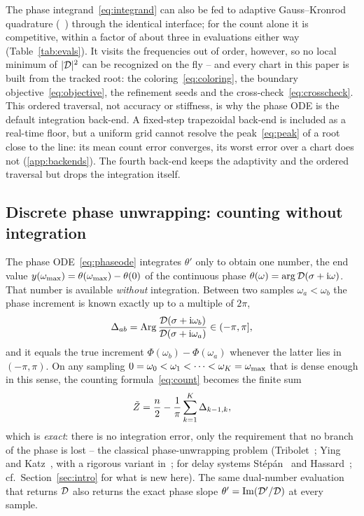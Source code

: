 The phase integrand~\eqref{eq:integrand} can also be fed to adaptive
Gauss--Kronrod quadrature (~\cite{johnson2013quadgk}) through
the identical interface; for the count alone it is competitive, within a
factor of about three in evaluations either way (Table~\ref{tab:evals}).
It visits the frequencies out of order, however, so no local minimum of
$|\mathcal{D}|^{2}$ can be recognized on the fly -- and every chart in this paper
is built from the tracked root: the coloring~\eqref{eq:coloring}, the
boundary objective~\eqref{eq:objective}, the refinement seeds and the
cross-check~\eqref{eq:crosscheck}. This ordered traversal, not accuracy or
stiffness, is why the phase ODE is the default integration back-end. A
fixed-step trapezoidal back-end is included as a real-time floor, but a
uniform grid cannot resolve the peak~\eqref{eq:peak} of a root close to the
line: its mean count error converges, its worst error over a chart does not
(\ref{app:backends}). The fourth back-end keeps the adaptivity and the
ordered traversal but drops the integration itself.
\subsection{Discrete phase unwrapping: counting without integration}\label{sec:unwrap}

The phase ODE~\eqref{eq:phaseode} integrates $\theta'$ only to obtain one
number, the end value $y(\omega_{\mathrm{max}})=\theta(\omega_{\mathrm{max}})-\theta(0)$ of the continuous
phase $\theta(\omega)=\arg\mathcal{D}(\sigma+\mathrm{i}\omega)$. That number is available
\emph{without} integration. Between two samples $\omega_a<\omega_b$ the phase
increment is known exactly up to a multiple of $2\pi$,
\begin{equation}\label{eq:dphase}
  \Delta_{ab} = \operatorname{Arg}\frac{\mathcal{D}(\sigma+\mathrm{i}\omega_b)}{\mathcal{D}(\sigma+\mathrm{i}\omega_a)}
  \in(-\pi,\pi],
\end{equation}
and it equals the true increment $\Phi(\omega_b)-\Phi(\omega_a)$ whenever
the latter lies in $(-\pi,\pi)$. On any sampling
$0=\omega_0<\omega_1<\dots<\omega_K=\omega_{\mathrm{max}}$ that is dense enough in this sense,
the counting formula~\eqref{eq:count} becomes the finite sum
\begin{equation}\label{eq:unwrapcount}
  \tilde{Z} = \frac{n}{2} - \frac{1}{\pi}\sum_{k=1}^{K}\Delta_{k-1,k},
\end{equation}
which is \emph{exact}: there is no integration error, only the requirement
that no branch of the phase is lost -- the classical phase-unwrapping problem
(Tribolet~\cite{tribolet1977new}; Ying and Katz~\cite{ying1988reliable}, with
a rigorous variant in~\cite{johnson2009enclosing}; for delay systems
St\'ep\'an~\cite{stepan1989retarded} and Hassard~\cite{hassard1997counting};
cf.\ Section~\ref{sec:intro} for what is new here). The same dual-number
evaluation that returns $\mathcal{D}$ also returns the exact phase slope
$\theta'=\operatorname{Im}(\mathcal{D}'/\mathcal{D})$ at every sample.

